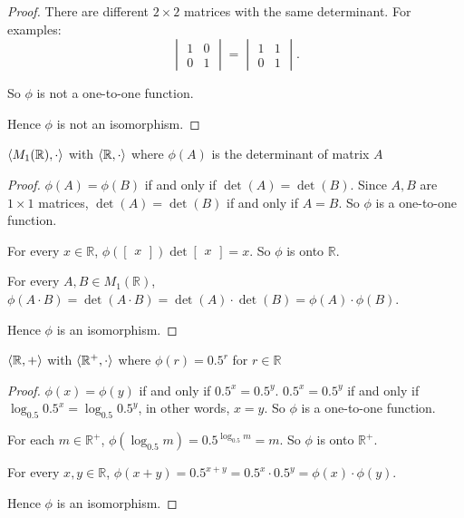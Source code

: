 \begin{proof}
    There are different $2\times 2$ matrices with the same determinant. For examples:
    \[
        \begin{vmatrix}
            1 & 0 \\
            0 & 1
        \end{vmatrix}
        =
        \begin{vmatrix}
            1 & 1 \\
            0 & 1
        \end{vmatrix}.
    \]

    So $\phi$ is not a one-to-one function.

    Hence $\phi$ is not an isomorphism.
\end{proof}

\begin{exercise}
    $\left\langle{M_{1}(\mathbb{R}),\cdot}\right\rangle$ with $\left\langle{\mathbb{R},\cdot}\right\rangle$ where $\phi(A)$ is the determinant of matrix $A$
\end{exercise}

\begin{proof}
    $\phi(A) = \phi(B)$ if and only if $\det(A) = \det(B)$. Since $A, B$ are $1\times 1$ matrices, $\det(A) = \det(B)$ if and only if $A = B$. So $\phi$ is a one-to-one function.

    For every $x\in\mathbb{R}$, $\phi(\begin{bmatrix}x\end{bmatrix})\det\begin{bmatrix}x\end{bmatrix} = x$. So $\phi$ is onto $\mathbb{R}$.

    For every $A, B\in M_{1}(\mathbb{R})$, $\phi(A\cdot B) = \det(A\cdot B) = \det(A)\cdot\det(B) = \phi(A)\cdot\phi(B)$.

    Hence $\phi$ is an isomorphism.
\end{proof}

\begin{exercise}
    $\left\langle{\mathbb{R}, +}\right\rangle$ with $\left\langle{\mathbb{R}^{+},\cdot}\right\rangle$ where $\phi(r) = {0.5}^{r}$ for $r\in\mathbb{R}$
\end{exercise}

\begin{proof}
    $\phi(x) = \phi(y)$ if and only if ${0.5}^{x} = {0.5}^{y}$. ${0.5}^{x} = {0.5}^{y}$ if and only if $\log_{0.5}{0.5}^{x} = \log_{0.5}{0.5}^{y}$, in other words, $x = y$. So $\phi$ is a one-to-one function.

    For each $m\in\mathbb{R}^{+}$, $\phi(\log_{0.5}m) = {0.5}^{\log_{0.5}m} = m$. So $\phi$ is onto $\mathbb{R}^{+}$.

    For every $x, y\in\mathbb{R}$, $\phi(x + y) = {0.5}^{x+y} = {0.5}^{x}\cdot{0.5}^{y} = \phi(x)\cdot\phi(y)$.

    Hence $\phi$ is an isomorphism.
\end{proof}

